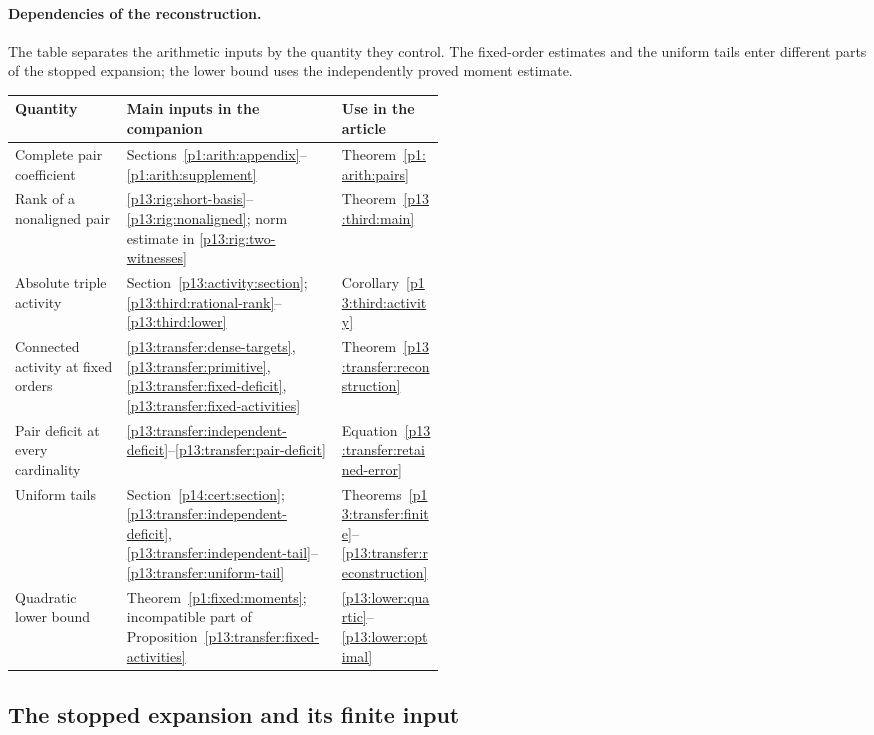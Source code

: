 \paragraph{Dependencies of the reconstruction.}
The table separates the arithmetic inputs by the quantity they control.
The fixed-order estimates and the uniform tails enter different parts
of the stopped expansion; the lower bound uses the independently proved
moment estimate.
\begin{center}
\small
\begin{tabularx}{\linewidth}{@{}>{\raggedright\arraybackslash}p{0.26\linewidth}>{\raggedright\arraybackslash}X>{\raggedright\arraybackslash}p{0.24\linewidth}@{}}
\toprule
Quantity & Main inputs in the companion & Use in the article\\
\midrule
Complete pair coefficient
& Sections~\ref{p1:arith:appendix}--\ref{p1:arith:supplement}
& Theorem~\ref{p1:arith:pairs}\\[5pt]
Rank of a nonaligned pair
& \ref{p13:rig:short-basis}--\ref{p13:rig:nonaligned};
  norm estimate in \ref{p13:rig:two-witnesses}
& Theorem~\ref{p13:third:main}\\[5pt]
Absolute triple activity
& Section~\ref{p13:activity:section};
  \ref{p13:third:rational-rank}--\ref{p13:third:lower}
& Corollary~\ref{p13:third:activity}\\[5pt]
Connected activity at fixed orders
& \ref{p13:transfer:dense-targets},
  \ref{p13:transfer:primitive},
  \ref{p13:transfer:fixed-deficit},
  \ref{p13:transfer:fixed-activities}
& Theorem~\ref{p13:transfer:reconstruction}\\[5pt]
Pair deficit at every cardinality
& \ref{p13:transfer:independent-deficit}--\ref{p13:transfer:pair-deficit}
& Equation~\eqref{p13:transfer:retained-error}\\[5pt]
Uniform tails
& Section~\ref{p14:cert:section};
  \ref{p13:transfer:independent-deficit},
  \ref{p13:transfer:independent-tail}--\ref{p13:transfer:uniform-tail}
& Theorems~\ref{p13:transfer:finite}--\ref{p13:transfer:reconstruction}\\[5pt]
Quadratic lower bound
& Theorem~\ref{p1:fixed:moments}; incompatible part of
  Proposition~\ref{p13:transfer:fixed-activities}
& \ref{p13:lower:quartic}--\ref{p13:lower:optimal}\\
\bottomrule
\end{tabularx}
\end{center}

\subsection{The stopped expansion and its finite input}

